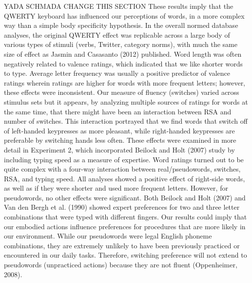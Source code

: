 \documentclass[english,man]{apa6}
\theoremstyle{definition}
\theoremstyle{definition}
\theoremstyle{definition}
\theoremstyle{remark}
\begin{document}
YADA SCHMADA CHANGE THIS SECTION These results imply that the QWERTY
keyboard has influenced our perceptions of words, in a more complex way
than a simple body specificity hypothesis. In the overall normed
database analyses, the original QWERTY effect was replicable across a
large body of various types of stimuli (verbs, Twitter, category norms),
with much the same size of effect as Jasmin and Casasanto (2012)
published. Word length was often negatively related to valence ratings,
which indicated that we like shorter words to type. Average letter
frequency was usually a positive predictor of valence ratings wherein
ratings are higher for words with more frequent letters; however, these
effects were inconsistent. Our measure of fluency (switches) varied
across stimulus sets but it appears, by analyzing multiple sources of
ratings for words at the same time, that there might have been an
interaction between RSA and number of switches. This interaction
portrayed that we find words that switch off of left-handed keypresses
as more pleasant, while right-handed keypresses are preferable by
switching hands less often. These effects were examined in more detail
in Experiment 2, which incorporated Beilock and Holt (2007) study by
including typing speed as a measure of expertise. Word ratings turned
out to be quite complex with a four-way interaction between
real/pseudowords, switches, RSA, and typing speed. All analyses showed a
positive effect of right-side words, as well as if they were shorter and
used more frequent letters. However, for pseudowords, no other effects
were significant. Both Beilock and Holt (2007) and Van den Bergh et al.
(1990) showed expert preferences for two and three letter combinations
that were typed with different fingers. Our results could imply that our
embodied actions influence preferences for procedures that are more
likely in our environment. While our pseudowords were legal English
phoneme combinations, they are extremely unlikely to have been
previously practiced or encountered in our daily tasks. Therefore,
switching preference will not extend to pseudowords (unpracticed
actions) because they are not fluent (Oppenheimer, 2008).
\end{document}

